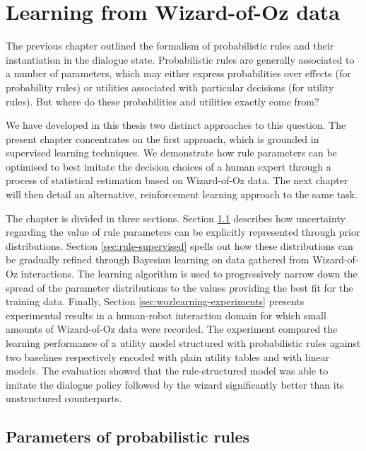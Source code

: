 
\chapter{Learning from Wizard-of-Oz data}
\label{chap:wozlearning}

The previous chapter outlined the formalism of probabilistic rules and their instantiation in the dialogue state. Probabilistic rules are generally associated to a number of parameters, which may either express probabilities over effects (for probability rules) or utilities associated with particular decisions (for utility rules). But where do these probabilities and utilities exactly come from?

We have developed in this thesis two distinct approaches to this question. The present chapter concentrates on the first approach, which is grounded in supervised learning techniques. We demonstrate how rule parameters can be optimised to best imitate the decision choices of a human expert through a process of statistical estimation based on Wizard-of-Oz data. The next chapter will then detail an alternative, reinforcement learning approach to the same task.

The chapter is divided in three sections.  Section \ref{sec:rule-params} describes how uncertainty regarding the value of rule parameters can be explicitly represented through prior distributions. Section \ref{sec:rule-supervised} spells out how these distributions can be gradually refined through Bayesian learning on data gathered from Wizard-of-Oz interactions.  The learning algorithm  is used to progressively narrow down the spread of the parameter distributions to the values providing the best fit for the training data. Finally, Section \ref{sec:wozlearning-experiments} presents experimental results in a human-robot interaction domain for which small amounts of Wizard-of-Oz data were recorded. The experiment compared the learning performance of a utility model structured with probabilistic rules against two baselines respectively encoded with plain utility tables and with linear models. The evaluation showed that the rule-structured model was able to imitate the dialogue policy followed by the wizard significantly better than its unstructured counterparts.

\section{Parameters of probabilistic rules}
\label{sec:rule-params}

